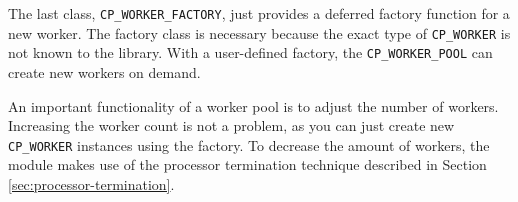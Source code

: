 The last class, \lstinline!CP_WORKER_FACTORY!, just provides a deferred factory function for a new worker.
The factory class is necessary because the exact type of \lstinline!CP_WORKER! is not known to the library.
With a user-defined factory, the \lstinline!CP_WORKER_POOL! can create new workers on demand.





An important functionality of a worker pool is to adjust the number of workers.
Increasing the worker count is not a problem, as you can just create new \lstinline!CP_WORKER! instances using the factory.
To decrease the amount of workers, the module makes use of the processor termination technique described in Section \ref{sec:processor-termination}.


% 
% 
% 
% 
%   
%   
% 
% 
% 


